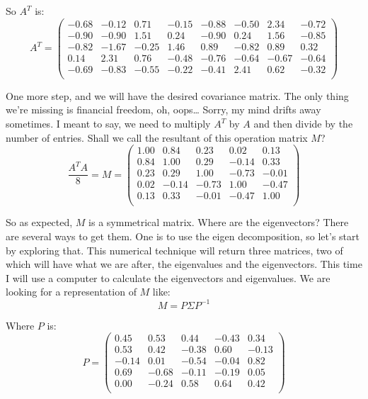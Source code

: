 \documentclass[a4,12pt,twosided,openany]{memoir}
\begin{document}
So $A^T$ is: 
\[ A^T = 
\begin{pmatrix}
 -0.68 & -0.12 &  0.71 & -0.15 & -0.88 & -0.50 &  2.34 & -0.72 \\
-0.90 & -0.90 &  1.51 &  0.24 & -0.90 &  0.24 &  1.56 & -0.85 \\
-0.82 & -1.67 & -0.25 &  1.46 &  0.89 & -0.82 &  0.89 &  0.32 \\
 0.14 &  2.31 &  0.76 & -0.48 & -0.76 & -0.64 & -0.67 & -0.64 \\
-0.69 & -0.83 & -0.55 & -0.22 & -0.41 &  2.41 &  0.62 & -0.32 \\
\end{pmatrix}
\]
\par 
\indent
One more step, and we will have the desired covariance matrix. The only thing we’re missing is financial freedom, oh, oops… Sorry, my mind drifts away sometimes. I meant to say, we need to multiply $A^T$ by $A$ and then divide by the number of entries. Shall we call the resultant of this operation matrix $M$?
\[ \frac{A^TA}{8} = M = 
\begin{pmatrix}
1.00 &  0.84 &  0.23 &  0.02 &  0.13 \\
0.84 &  1.00 &  0.29 & -0.14 &  0.33 \\
0.23 &  0.29 &  1.00 & -0.73 & -0.01 \\
0.02 & -0.14 & -0.73 &  1.00 & -0.47 \\
0.13 &  0.33 & -0.01 & -0.47 &  1.00 \\
\end{pmatrix}
\]
\par 
\indent
So as expected, $M$ is a symmetrical matrix. Where are the eigenvectors? There are several ways to get them. One is to use the eigen decomposition, so let’s start by exploring that. This numerical technique will return three matrices, two of which will have what we are after, the eigenvalues and the eigenvectors. This time I will use a computer to calculate the eigenvectors and eigenvalues. We are looking for a representation of $M$ like:
\[ M = P \Sigma P^{-1}\]
\par 
\indent
Where $P$ is:
\[ P = 
\begin{pmatrix}
  0.45 & 0.53 & 0.44 & -0.43 & 0.34 \\
  0.53 & 0.42 & -0.38 & 0.60 & -0.13 \\
 -0.14 & 0.01 & -0.54 & -0.04 & 0.82 \\ 
  0.69 & -0.68 & -0.11 & -0.19 & 0.05 \\ 
  0.00 & -0.24 & 0.58  & 0.64 & 0.42 \\
\end{pmatrix}
\]
\end{document}
